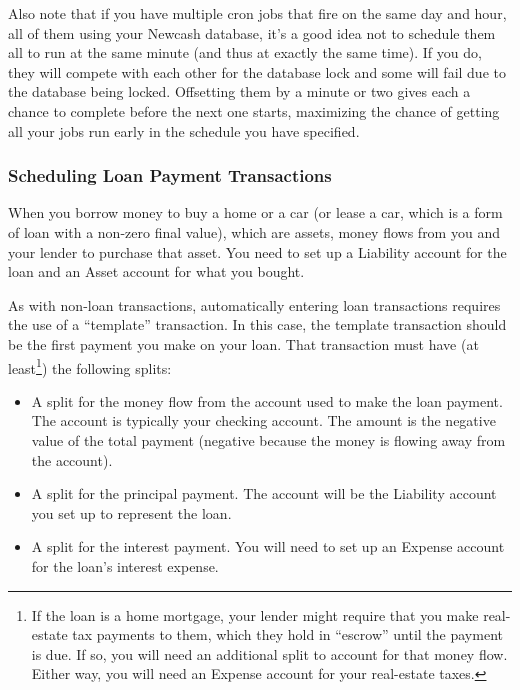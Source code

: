 \documentclass{report}
\begin{document}
Also note that if you have multiple cron jobs that fire on the same day and hour, all of them using your Newcash database, it's a good idea not to schedule them all to run at the same minute (and thus at exactly the same time). If you do, they will compete with each other for the database lock and some will fail due to the database being locked. Offsetting them by a minute or two gives each a chance to complete before the next one starts, maximizing the chance of getting all your jobs run early in the schedule you have specified.
\subsubsection{Scheduling Loan Payment Transactions}
When you borrow money to buy a home or a car (or lease a car, which is a form of loan with a non-zero final value), which are assets, money flows from you and your lender to purchase that asset. You need to set up a Liability account for the loan and an Asset account for what you bought.

As with non-loan transactions, automatically entering loan transactions requires the use of a ``template'' transaction. In this case, the template transaction should be the first payment you make on your loan. That transaction must have (at least\footnote{If the loan is a home mortgage, your lender might require that you make real-estate tax payments to them, which they hold in ``escrow'' until the payment is due. If so, you will need an additional split to account for that money flow. Either way, you will need an Expense account for your real-estate taxes.}) the following splits:
\begin{itemize}
\item A split for the money flow from the account used to make the loan payment. The account is typically your checking account. The amount is the negative value of the total payment (negative because the money is flowing away from the account).
\item A split for the principal payment. The account will be the Liability account you set up to represent the loan.
\item A split for the interest payment. You will need to set up an Expense account for the loan's interest expense.
\end{itemize}
\end{document}
